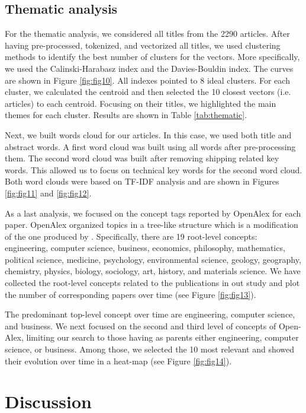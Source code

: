 \documentclass[jmse,review,submit,pdftex,moreauthors]{Definitions/mdpi}
\begin{document}
\subsection{Thematic analysis}
For the thematic analysis, we considered all titles from the 2290 articles. After having pre-processed, tokenized, and vectorized all titles, we used clustering methods to identify the best number of clusters for the vectors. More specifically, we used the Calinski-Harabasz index and the Davies-Bouldin index. The curves are shown in Figure \ref{fig:fig10}. All indexes pointed to 8 ideal clusters. For each cluster, we calculated the centroid and then selected the 10 closest vectors (i.e. articles) to each centroid. Focusing on their titles, we highlighted the main themes for each cluster. Results are shown in Table \ref{tab:thematic}.

Next, we built words cloud for our articles. In this case, we used both title and abstract words. A first word cloud was built using all words after pre-processing them. The second word cloud was built after removing shipping related key words. This allowed us to focus on technical key words for the second word cloud. Both word clouds were based on TF-IDF analysis and are shown in Figures \ref{fig:fig11} and \ref{fig:fig12}.

As a last analysis, we focused on the concept tags reported by OpenAlex for each paper. OpenAlex organized topics in a tree-like structure which is a modification of the one produced by \citep{shen2018web}. Specifically, there are 19 root-level concepts: engineering, computer science, business, economics, philosophy, mathematics, political science, medicine, psychology, environmental science, geology, geography, chemistry, physics, biology, sociology, art, history, and materials science. We have collected the root-level concepts related to the publications in out study and plot the number of corresponding papers over time (see Figure \ref{fig:fig13}).

The predominant top-level concept over time are engineering, computer science, and business. We next focused on the second and third level of concepts of Open-Alex, limiting our search to those having as parents either engineering, computer science, or business. Among those, we selected the 10 most relevant and showed their evolution over time in a heat-map (see Figure \ref{fig:fig14}).

\section{Discussion}
\end{document}
